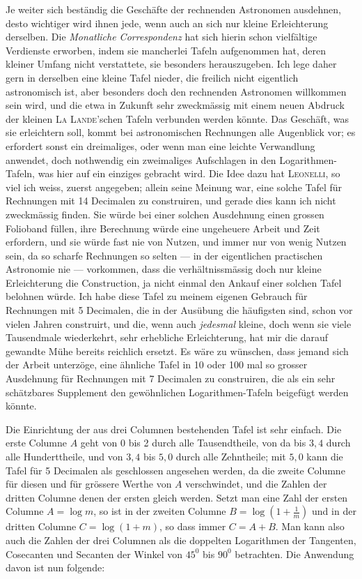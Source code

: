 Je weiter sich beständig die Geschäfte der rechnenden Astronomen ausdehnen, desto wichtiger wird ihnen jede, wenn auch an sich nur kleine Erleichterung derselben. Die \emph{Monatliche Correspondenz} hat sich hierin schon vielfältige
Verdienste erworben, indem sie mancherlei Tafeln aufgenommen hat, deren kleiner Umfang nicht verstattete, sie besonders herauszugeben. Ich lege daher gern
in derselben eine kleine Tafel nieder, die freilich nicht eigentlich astronomisch
ist, aber besonders doch den rechnenden Astronomen willkommen sein wird, und
die etwa in Zukunft sehr zweckmässig mit einem neuen Abdruck der kleinen \textsc{La
Lande}’schen Tafeln verbunden werden könnte. Das Geschäft, was sie erleichtern soll, kommt bei astronomischen Rechnungen alle Augenblick vor; es erfordert sonst ein dreimaliges, oder wenn man eine leichte Verwandlung anwendet,
doch nothwendig ein zweimaliges Aufschlagen in den Logarithmen-Tafeln, was
hier auf ein einziges gebracht wird. Die Idee dazu hat \textsc{Leonelli}, so viel ich weiss,
zuerst angegeben; allein seine Meinung war, eine solche Tafel für Rechnungen
mit 14 Decimalen zu construiren, und gerade dies kann ich nicht zweckmässig
finden. Sie würde bei einer solchen Ausdehnung einen grossen Folioband füllen,
ihre Berechnung würde eine ungeheuere Arbeit und Zeit erfordern, und sie würde
fast nie von Nutzen, und immer nur von wenig Nutzen sein, da so scharfe Rechnungen so selten --- in der eigentlichen practischen Astronomie nie --- vorkommen, dass die verhältnissmässig doch nur kleine Erleichterung die Construction,
ja nicht einmal den Ankauf einer solchen Tafel belohnen würde. Ich habe diese
Tafel zu meinem eigenen Gebrauch für Rechnungen mit 5 Decimalen, die in der
Ausübung die häufigsten sind, schon vor vielen Jahren construirt, und die, wenn
auch \emph{jedesmal} kleine, doch wenn sie viele Tausendmale wiederkehrt, sehr erhebliche Erleichterung, hat mir die darauf gewandte Mühe bereits reichlich ersetzt.
Es wäre zu wünschen, dass jemand sich der Arbeit unterzöge, eine ähnliche Tafel in 10 oder 100 mal so grosser Ausdehnung für Rechnungen mit 7 Decimalen zu
construiren, die als ein sehr schätzbares Supplement den gewöhnlichen Logarithmen-Tafeln beigefügt werden könnte.

Die Einrichtung der aus drei Columnen bestehenden Tafel ist sehr einfach.
Die erste Columne \(A\) geht von 0 bis 2 durch alle Tausendtheile, von da bis \(3,4\)
durch alle Hunderttheile, und von \(3,4\) bis \(5,0\) durch alle Zehntheile; mit \(5,0\)
kann die Tafel für 5 Decimalen als geschlossen angesehen werden, da die zweite
Columne für diesen und für grössere Werthe von \(A\) verschwindet, und die Zahlen der dritten Columne denen der ersten gleich werden. Setzt man eine Zahl
der ersten Columne \(A=\log m\), so ist in der zweiten Columne \(B=\log(1+\frac{1}{m})\)
und in der dritten Columne \(C=\log(1+m)\), so dass immer \(C=A+B\). Man
kann also auch die Zahlen der drei Columnen als die doppelten Logarithmen der
Tangenten, Cosecanten und Secanten der Winkel von \(45^{0}\) bis \(90^{0}\) betrachten.
Die Anwendung davon ist nun folgende:

